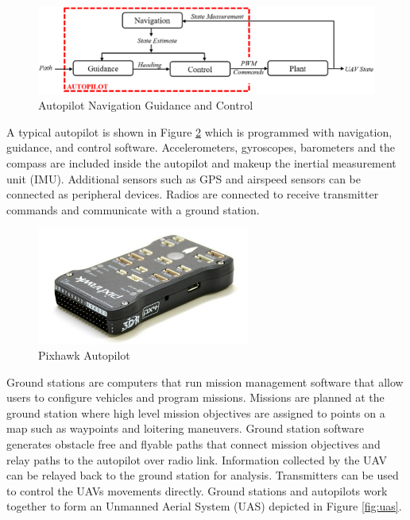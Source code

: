 \documentclass[numbered,pdftex]{ohio-etd}
\begin{document}
\begin{figure}
	\centering
	\includegraphics[width=15cm]{PaperFigures/autopilotLoops}
	\caption{Autopilot Navigation Guidance and Control}
	\label{fig:autopilotloops}
\end{figure}

A typical autopilot is shown in Figure \ref{fig:pixhawk} which is programmed with navigation, guidance, and control software. Accelerometers, gyroscopes, barometers and the compass are included inside the autopilot and makeup the inertial measurement unit (IMU). Additional sensors such as GPS and airspeed sensors can be connected as peripheral devices. Radios are connected to receive transmitter commands and communicate with a ground station. 

\begin{figure}
	\centering
	\includegraphics[width=7cm]{PaperFigures/pixhawk}
	\caption{Pixhawk Autopilot}
	\label{fig:pixhawk}
\end{figure}


Ground stations are computers that run mission management software that allow users to configure vehicles and program missions. Missions are planned at the ground station where high level mission objectives are assigned to points on a map such as waypoints and loitering maneuvers. Ground station software generates obstacle free and flyable paths that connect mission objectives and relay paths to the autopilot over radio link. Information collected by the UAV can be relayed back to the ground station for analysis. Transmitters can be used to control the UAVs movements directly. Ground stations and autopilots work together to form an Unmanned Aerial System (UAS) depicted in Figure \ref{fig:uas}.
\end{document}
